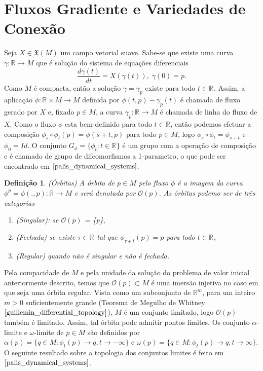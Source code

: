 \documentclass[12pt]{book}
\newtheorem{definicao}[teorema]{Definição}
\newcommand{\campossuaves}[1]{\mathfrak{X}(#1)}
\newcommand{\derivada}[2]{\frac{d #1}{d #2}}
\newcommand{\orbitaponto}[1]{\mathcal{O}(#1)}
\newcommand{\retacartesianovariedade}{\real{} \times M}
\newcommand{\real}[1]{\mathbb{R}^{#1}}
\newcommand{\reta}{\real{}}
\begin{document}
	\section{Fluxos Gradiente e Variedades de Conexão}
	Seja $X \in \campossuaves{M}$ um campo vetorial suave. Sabe-se que existe uma curva $\gamma: \reta\to M$ que é solução do sistema de equações diferenciais 
	$$
	\derivada{\gamma(t)}{t} = X(\gamma(t)), \; \gamma(0) = p.
	$$
	Como $M$ é compacta, então a solução $\gamma = \gamma_{p}$ existe para todo $t\in \reta$. Assim, a aplicação $\phi: \retacartesianovariedade\to M$ definida por $\phi(t,p) - \gamma_{p}(t)$ é chamada de fluxo gerado por $X$ e, fixado $p\in M$, a curva $\gamma_{p}:\reta\to M$ é chamada de linha do fluxo de $X$. Como o fluxo $\phi$ esta bem-definido para todo $t \in \reta$, então podemos efetuar a composição $\phi_{s}\circ\phi_{t}(p) = \phi(s+t, p)$ para todo $p\in M$, logo $\phi_{s}\circ\phi_{t} = \phi_{s+t}$ e $\phi_{0} = Id$. O conjunto $G_{\phi} = \{\phi_{t}:t\in \reta\}$ é um grupo com a operação de composição e é chamado de grupo de difeomorfismos a 1-parametro, o que pode ser encontrado em $\cite{palis_dynamical_systems}$.
	
	\begin{definicao}
		(Órbitas) A órbita de $p \in M$ pelo fluxo $\phi$ é a imagem da curva $\phi^{p} = \phi(.,p):\reta\to M$ e será denotada por $\orbitaponto{p}$. As órbitas podemo ser de três categorias
		\begin{enumerate}
			\item (Singular): se $\orbitaponto{p}$ = \{p\},
			
			\item (Fechada) se existe $\tau \in \reta$ tal que $\phi_{\tau+t}(p) = p$ para todo $t \in \reta$,
			
			\item (Regular) quando não é singular e não é fechada.
		\end{enumerate}
		
	\end{definicao}
	
	Pela compacidade de $M$ e pela unidade da solução do problema de valor inicial anteriormente descrito, temos que $\orbitaponto{p}\subset M$ é uma imersão injetiva no caso em que seja uma órbita regular. Vista como um subconjunto de $\real{m}$, para um inteiro $m>0$ suficientemente grande (Teorema de Megulho de Whitney $\cite{guillemin_differential_topology}$), $M$ é um conjunto limitado, logo $\orbitaponto{p}$ também é limitado. Assim, tal órbita pode admitir pontos limites. Os conjunto $\alpha$-limite e $\omega$-limite de $p \in M$ são definidos por $\alpha(p) = \{q \in M: \phi_{t}(p) \to q, t \to -\infty\}$ e $\omega(p) = \{q \in M: \phi_{t}(p) \to q, t \to \infty\}$. O seguinte resultado sobre a topologia dos conjuntos limites é feito em $\cite{palis_dynamical_systems}$.
	
\end{document}
